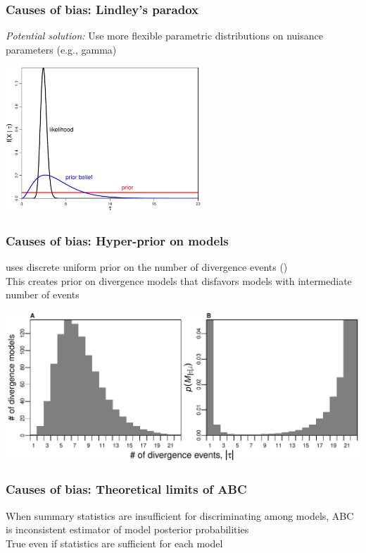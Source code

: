 \begin{frame}
    \frametitle{Causes of bias: Lindley's paradox}
    \begin{block}{\it Potential solution:}
        Use more flexible parametric distributions on nuisance parameters (e.g., gamma)
    \end{block}
    \smallskip
    \centerline{
    \includegraphics[height=5.5cm]{images/likelihood-vs-prior-vs-belief-example.pdf}}
\end{frame}

\begin{frame}
    \frametitle{Causes of bias: Hyper-prior on models}
    \msb uses discrete uniform prior on the number of divergence events
    (\numt{})\\
    \bigskip
    This creates prior on divergence models that disfavors models with
    intermediate number of events\\
    \bigskip
    \centerline{
    \includegraphics[width=\textwidth]{images/partition_numbers.pdf}}
\end{frame}

\begin{frame}
    \frametitle{Causes of bias: Theoretical limits of ABC}
    When summary statistics are insufficient for discriminating among models,
    ABC is inconsistent estimator of model posterior probabilities
    \\
    \bigskip
    True even if statistics are sufficient for each model\\
\end{frame}

